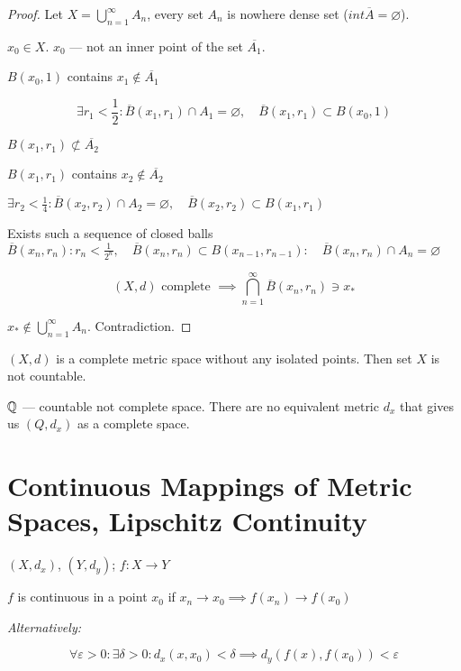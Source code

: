 \begin{proof}
  Let $X =  \bigcup_{n=1}^{\infty} A_{n}$, every set $A_{n}$ is nowhere dense set ($int \overline{A} = \varnothing$).

  $x_0 \in  X$. $x_0$ --- not an inner point of the set $\overline{A_1}$.

  $B(x_0, 1)$ contains $x_1 \not\in \overline{A_1}$ 

  \[ \exists r_1 < \frac{1}{2} : \overline{B}(x_1, r_1) \cap A_1 = \varnothing, 
  \quad \overline{B}(x_1, r_1) \subset B(x_0, 1) \] 

  $B(x_1, r_1) \not\subset \overline{A_2}$

  $B(x_1, r_1)$ contains $x_2 \not\in \overline{A_2}$

  $\exists r_2 < \frac{1}{4} : \overline{B}(x_2, r_2) \cap A_2 = \varnothing, \quad \overline{B}(x_2, r_2) \subset B(x_1, r_1)$

  Exists such a sequence of closed balls $\overline{B}(x_{n}, r_n): r_n < \frac{1}{2^{n}}, \quad \overline{B}(x_{n}, r_n) \subset B(x_{n-1}, r_{n-1}): \quad \overline{B}(x_{n}, r_n) \cap A_n = \varnothing$

  \[ (X,d) \text{ complete } \implies \bigcap_{n=1}^{\infty} \overline{B}(x_{n}, r_n) \ni x_{*} \] 

  $x_* \not\in \bigcup_{n=1}^{\infty} A_n$. Contradiction.
\end{proof}


\begin{corollary}
  $(X,d)$ is a complete metric space without any isolated points. Then set $X$ is not countable.
\end{corollary}

\begin{corollary}
  $\mathbb{Q}$ --- countable not complete space.
  There are no equivalent metric $d_x$ that gives us $(Q, d_x)$ as a complete space.
\end{corollary}



\section{Continuous Mappings of Metric Spaces, Lipschitz Continuity}


$(X, d_x)$, $(Y, d_y)$; $f: X \to  Y$ 

\begin{definition}
$f$ is continuous in a point $x_0$ if $x_n \to  x_0 \implies f(x_n) \to  f(x_0)$

\textit{Alternatively:}

\[ \forall \varepsilon > 0 : \exists \delta > 0 : d_x(x,x_0) < \delta \implies d_y(f(x), f(x_0)) < \varepsilon \] 
  
\end{definition}

